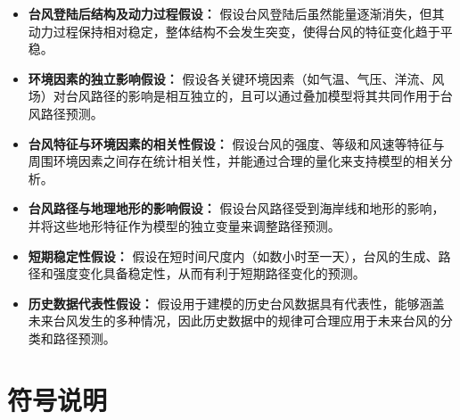 \documentclass[withoutpreface,bwprint]{cumcmthesis}
\begin{document}
\begin{itemize}
    \item[] \textbullet \hspace{1em} \textbf{台风登陆后结构及动力过程假设：} 假设台风登陆后虽然能量逐渐消失，但其动力过程保持相对稳定，整体结构不会发生突变，使得台风的特征变化趋于平稳。

    \item[] \textbullet \hspace{1em} \textbf{环境因素的独立影响假设：} 假设各关键环境因素（如气温、气压、洋流、风场）对台风路径的影响是相互独立的，且可以通过叠加模型将其共同作用于台风路径预测。

    \item[] \textbullet \hspace{1em} \textbf{台风特征与环境因素的相关性假设：} 假设台风的强度、等级和风速等特征与周围环境因素之间存在统计相关性，并能通过合理的量化来支持模型的相关分析。

    \item[] \textbullet \hspace{1em} \textbf{台风路径与地理地形的影响假设：} 假设台风路径受到海岸线和地形的影响，并将这些地形特征作为模型的独立变量来调整路径预测。

    \item[] \textbullet \hspace{1em} \textbf{短期稳定性假设：} 假设在短时间尺度内（如数小时至一天），台风的生成、路径和强度变化具备稳定性，从而有利于短期路径变化的预测。

    \item[] \textbullet \hspace{1em} \textbf{历史数据代表性假设：} 假设用于建模的历史台风数据具有代表性，能够涵盖未来台风发生的多种情况，因此历史数据中的规律可合理应用于未来台风的分类和路径预测。
\end{itemize}



\section{符号说明}
\end{document}
